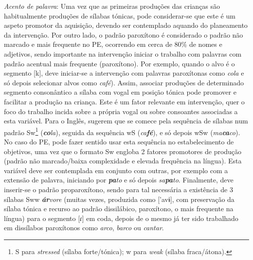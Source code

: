 \documentclass[output=paper,colorlinks,citecolor=brown,booklanguage=portuguese]{langscibook}
\begin{document}
\emph{Acento de palavra}: Uma vez que as primeiras produções das crianças são habitualmente produções de sílabas tónicas, pode considerar-se que este é um aspeto promotor da aquisição, devendo ser contemplado aquando do planeamento da intervenção. Por outro lado, o padrão paroxítono é considerado o padrão não marcado e mais frequente no PE, ocorrendo em cerca de 80\% de nomes e adjetivos, sendo importante na intervenção iniciar o trabalho com palavras com padrão acentual mais frequente (paroxítono). Por exemplo, quando o alvo é o segmento [k], deve iniciar-se a intervenção com palavras paroxítonas como \emph{cola} e só depois selecionar alvos como \emph{café}). Assim, associar produções de determinado segmento consonântico a sílaba com vogal em posição tónica pode promover e facilitar a produção na criança. Este é um fator relevante em intervenção, quer o foco do trabalho incida sobre a própria vogal ou sobre consoantes associadas a esta variável. Para o Inglês, \citet{Bernhardt2000} sugerem que se comece pela sequência de sílabas num padrão Sw\footnote{S para \emph{stressed} (sílaba forte/tónica); w para \emph{weak} (sílaba fraca/átona).} (\emph{\textbf{co}la}), seguida da sequência wS (\emph{ca\textbf{fé}}), e só depois wSw (\emph{ma\textbf{ca}co}). No caso do PE, pode fazer sentido usar esta sequência no estabelecimento de objetivos, uma vez que o formato Sw engloba 2 fatores promotores de produção (padrão não marcado/baixa complexidade e e\-levada frequência na língua). Esta variável deve ser contemplada em conjunto com outras, por exemplo com a extensão de palavra, iniciando por \emph{\textbf{pa}to} e só depois \emph{sa\textbf{pa}to}. Finalmente, deve inserir-se o padrão proparoxítono, sendo para tal necessária a existência de 3 sílabas Sww \emph{\textbf{ár}vore} (muitas vezes, produzida como ['avɨ], com preservação da sílaba tónica e recurso ao padrão dissilábico, paro\-xítono, o mais frequente na língua) para o segmento [ɾ] em coda, depois de o mesmo já ter sido trabalhado em dissílabos paroxítonos como \emph{arco}, \emph{barco} ou \emph{cantar}.
\end{document}
